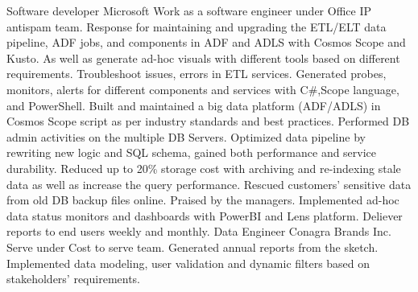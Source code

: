 \documentclass[a4paper]{ReadableCV}
\begin{document}
{}
        {Software developer}
        {Microsoft}
        {Work as a software engineer under Office IP antispam team. Response for maintaining and upgrading the ETL/ELT data pipeline, ADF jobs, and components in 
		ADF and ADLS with Cosmos Scope and Kusto. As well as generate ad-hoc visuals with different tools based on different requirements. }
{Troubleshoot issues, errors in ETL services. Generated probes, monitors, alerts for different components and services with C\#,Scope language, and PowerShell.}
{Built and maintained a big data platform (ADF/ADLS) in Cosmos Scope script as per industry standards and best practices.}
{Performed DB admin activities on the multiple DB Servers. Optimized data pipeline by rewriting new logic and SQL schema, gained both performance and service 
durability. Reduced up to 20\% storage cost with archiving and re-indexing stale data as well as increase the query performance.}
{Rescued customers' sensitive data from old DB backup files online. Praised by the managers.}
{Implemented ad-hoc data status monitors and dashboards with PowerBI and Lens platform. Deliever reports to end users weekly and monthly.}
{Data Engineer}
{Conagra Brands Inc.}
{Serve under Cost to serve team. Generated annual reports from the sketch.  Implemented data modeling, user validation and dynamic filters based on stakeholders' requirements.}
\end{document}
